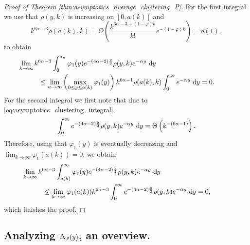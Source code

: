 \begin{proof}[Proof of Theorem \ref{thm:asymptotics_average_clustering_P}]
For the first integral we use that $\rho(y,k)$ is increasing on $[0,a(k)]$ and
\[
	k^{6\alpha - 3}\rho(a(k),k) = O\left(\frac{k^{6\alpha - 3 + (1-\varphi)k}}{k!} e^{-(1-\varphi)k}\right) = o(1),
\]
to obtain
\begin{align*}
	&\hspace{-30pt}\lim_{k \to \infty} k^{6\alpha - 3} \int_0^{a_n} \varphi_1(y) e^{-(4\alpha - 2)\frac{y}{2}} 
    	\rho(y,k) e^{-\alpha y} \dd y\\
	&\le \lim_{n \to \infty} \left(\max_{0 \le y \le a(k)} \varphi_1(y)\right) k^{6\alpha - 1} 
    	\rho(a(k), k) \int_0^\infty e^{-\alpha y} \dd y = 0.
\end{align*}
For the second integral we first note that due to \eqref{eq:asymptotics_clustering_integral}
\[
	\int_0^\infty e^{-(4\alpha - 2)\frac{y}{2}} \rho(y,k) e^{-\alpha y} \operatorname{\, \mathrm{d}\hspace{-2pt}} y = \Theta\left(k^{-(6\alpha - 1)}\right).
\] 
Therefore, using that $\varphi_1(y)$ is eventually decreasing and $\lim_{k \to \infty} \varphi_1(a(k)) = 0$, we obtain
\begin{align*}
	&\hspace{-30pt}\lim_{k \to \infty} k^{6\alpha - 3} \int_{a(k)}^{\infty} \varphi_1(y) 
    	e^{-(4\alpha - 2)\frac{y}{2}} \rho(y,k) e^{-\alpha y} \dd y\\
	&\le \lim_{k \to \infty} \varphi_1(a(k)) k^{6\alpha - 3} \int_0^\infty 
    	e^{-(4\alpha - 2)\frac{y}{2}} \rho(y,k) e^{-\alpha y} \dd y = 0,
\end{align*}
which finishes the proof.
\end{proof}

\subsection{Analyzing $\Delta_{{\mathcal P}}(y)$, an overview.}\label{ssec:asymptotics_Delta_y_P}

